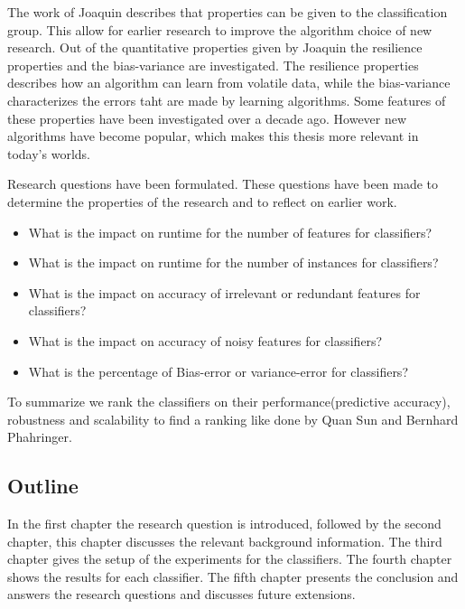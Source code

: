 \documentclass[a4paper,10pt]{article}
\begin{document}
The work of Joaquin describes that properties can be given to the classification group. This allow for earlier research to improve the algorithm choice of new research. Out of the quantitative properties given by Joaquin the resilience properties and the bias-variance are investigated. The resilience properties describes how an algorithm can learn from volatile data, while the bias-variance characterizes the errors taht are made by learning algorithms. Some features of these properties have been investigated over a decade ago. However new algorithms have become popular, which makes this thesis more relevant in today's worlds. 

Research questions have been formulated. These questions have been made to determine the properties of the research and to reflect on earlier work. 


\begin{itemize}
	\item What is the impact on runtime for the number of features for classifiers?
	\item What is the impact on runtime for the number of instances for classifiers?
	\item What is the impact on accuracy of irrelevant or redundant features for classifiers?
	\item What is the impact on accuracy of noisy features for classifiers?
	\item What is the percentage of Bias-error or variance-error for classifiers?
\end{itemize}

To summarize we rank the classifiers on their performance(predictive accuracy), robustness and scalability to find a ranking like done by Quan Sun and Bernhard Phahringer\cite{ranking}.




\subsection{Outline}
In the first chapter the research question is introduced, followed by the second chapter, this chapter discusses the relevant background information. The third chapter gives the setup of the experiments for the classifiers. The fourth chapter shows the results for each classifier. The fifth chapter presents the conclusion and answers the research questions and discusses future extensions.
\end{document}
